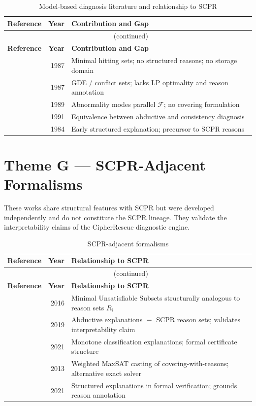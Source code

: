 \documentclass[11pt,a4paper]{report}
\newcommand{\calF}{\mathcal{F}}
\begin{document}
\begin{longtable}{@{}p{5.5cm}rp{7cm}@{}}
\caption{Model-based diagnosis literature and relationship to SCPR}\label{tab:themeF}\\
\toprule \textbf{Reference} & \textbf{Year} & \textbf{Contribution and Gap} \\ \midrule
\endfirsthead
\multicolumn{3}{c}{\tablename\ \thetable{} (continued)}\\ \toprule \textbf{Reference} & \textbf{Year} & \textbf{Contribution and Gap} \\ \midrule
\endhead
\citet{reiter1987} & 1987 & Minimal hitting sets; no structured reasons; no storage domain \\
\citet{dekleer1987} & 1987 & GDE / conflict sets; lacks LP optimality and reason annotation \\
\citet{struss1989} & 1989 & Abnormality modes parallel $\calF$; no covering formulation \\
\citet{console1991} & 1991 & Equivalence between abductive and consistency diagnosis \\
\citet{genesereth1984} & 1984 & Early structured explanation; precursor to SCPR reasons \\
\bottomrule
\end{longtable}

\section{Theme G --- SCPR-Adjacent Formalisms}

These works share structural features with SCPR but were developed independently and do not constitute the SCPR lineage. They validate the interpretability claims of the CipherRescue diagnostic engine.

\begin{longtable}{@{}p{5.5cm}rp{7cm}@{}}
\caption{SCPR-adjacent formalisms}\label{tab:themeG}\\
\toprule \textbf{Reference} & \textbf{Year} & \textbf{Relationship to SCPR} \\ \midrule
\endfirsthead
\multicolumn{3}{c}{\tablename\ \thetable{} (continued)}\\ \toprule \textbf{Reference} & \textbf{Year} & \textbf{Relationship to SCPR} \\ \midrule
\endhead
\citet{liffiton2016} & 2016 & Minimal Unsatisfiable Subsets structurally analogous to reason sets $R_i$ \\
\citet{ignatiev2019} & 2019 & Abductive explanations $\equiv$ SCPR reason sets; validates interpretability claim \\
\citet{marquessilva2021} & 2021 & Monotone classification explanations; formal certificate structure \\
\citet{davies2013} & 2013 & Weighted MaxSAT casting of covering-with-reasons; alternative exact solver \\
\citet{cimatti2021} & 2021 & Structured explanations in formal verification; grounds reason annotation \\
\bottomrule
\end{longtable}
\end{document}
